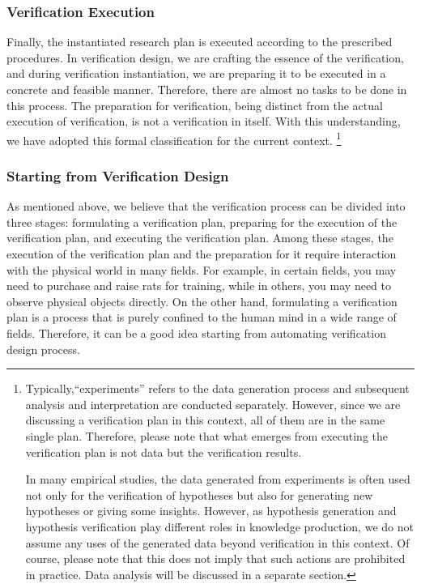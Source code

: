 \subsubsection{Verification Execution}
Finally, the instantiated research plan is executed according to the prescribed procedures. In verification design, we are crafting the essence of the verification, and during verification instantiation, we are preparing it to be executed in a concrete and feasible manner. Therefore, there are almost no tasks to be done in this process. The preparation for verification, being distinct from the actual execution of verification, is not a verification in itself. With this understanding, we have adopted this formal classification for the current context.
\footnote{
Typically,``experiments'' refers to the data generation process and subsequent analysis and interpretation are conducted separately. However, since we are discussing a verification plan in this context, all of them are in the same single plan. Therefore, please note that what emerges from executing the verification plan is not data but the verification results.

In many empirical studies, the data generated from experiments is often used not only for the verification of hypotheses but also for generating new hypotheses or giving some insights. However, as hypothesis generation and hypothesis verification play different roles in knowledge production, we do not assume any uses of the generated data beyond verification in this context. Of course, please note that this does not imply that such actions are prohibited in practice. Data analysis will be discussed in a separate section.
}

\subsubsection{Starting from Verification Design}

As mentioned above, we believe that the verification process can be divided into three stages: formulating a verification plan, preparing for the execution of the verification plan, and executing the verification plan. Among these stages, the execution of the verification plan and the preparation for it require interaction with the physical world in many fields. For example, in certain fields, you may need to purchase and raise rats for training, while in others, you may need to observe physical objects directly. On the other hand, formulating a verification plan is a process that is purely confined to the human mind in a wide range of fields. Therefore, it can be a good idea starting from automating verification design process.

